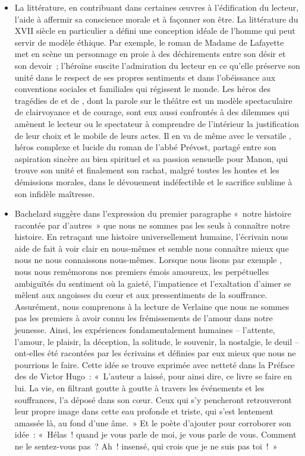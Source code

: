 {\begin{itemize}[label=\textbullet]
\item La littérature, en contribuant dans certaines œuvres à l'édification du lecteur, l'aide à
affermir sa conscience morale et à façonner son être. La littérature du XVII\ieme{} siècle en
particulier a défini une conception idéale de l'homme qui peut servir de modèle éthique.
Par exemple, le roman de Madame de Lafayette  met en scène
un personnage en proie à des déchirements entre son désir et son devoir~; l'héroïne
suscite l'admiration du lecteur en ce qu'elle préserve son unité dans le respect de ses
propres sentiments et dans l'obéissance aux conventions sociales et familiales qui
régissent le monde. Les héros des tragédies de  et de , dont la parole
sur le théâtre est un modèle spectaculaire de clairvoyance et de courage, sont eux
aussi confrontés à des dilemmes qui amènent le lecteur ou le spectateur à comprendre
de l'intérieur la justification de leur choix et le mobile de leurs actes. Il en va de même
avec le versatile , héros complexe et lucide du roman de l'abbé
Prévost, partagé entre son aspiration sincère au bien spirituel et sa passion sensuelle
pour Manon, qui trouve son unité et finalement son rachat, malgré toutes les hontes et
les démissions morales, dans le dévouement indéfectible et le sacrifice sublime à son
infidèle maîtresse.

\item Bachelard suggère dans l'expression du premier paragraphe «~notre histoire
racontée par d'autres~» que nous ne sommes pas les seuls à connaître notre histoire.
En retraçant une histoire universellement humaine, l'écrivain nous aide de fait à voir
clair en nous-mêmes et semble nous connaître mieux que nous ne nous connaissons
nous-mêmes. Lorsque nous lisons par exemple , nous nous
remémorons nos premiers émois amoureux, les perpétuelles ambiguïtés du sentiment
où la gaieté, l'impatience et l'exaltation d'aimer se mêlent aux angoisses du cœur et
aux pressentiments de la souffrance. Assurément, nous comprenons à la lecture de
Verlaine que nous ne sommes pas les premiers à avoir connu les frémissements de
l'amour dans notre jeunesse. Ainsi, les expériences fondamentalement humaines --
l'attente, l'amour, le plaisir, la déception, la solitude, le souvenir, la nostalgie, le deuil -- ont-elles été racontées par les écrivains et définies par eux mieux que nous ne
pourrions le faire. Cette idée se trouve exprimée avec netteté dans la Préface des
 de Victor Hugo~: «~L'auteur a laissé, pour ainsi dire, ce livre se faire
en lui. La vie, en filtrant goutte à goutte à travers les événements et les souffrances,
l'a déposé dans son cœur. Ceux qui s'y pencheront retrouveront leur propre image
dans cette eau profonde et triste, qui s'est lentement amassée là, au fond d'une âme.~»
Et le poète d'ajouter pour corroborer son idée~: «~Hélas~! quand je vous parle de moi,
je vous parle de vous. Comment ne le sentez-vous pas~? Ah~! insensé, qui crois que
je ne suis pas toi~!~»


\end{itemize}}
